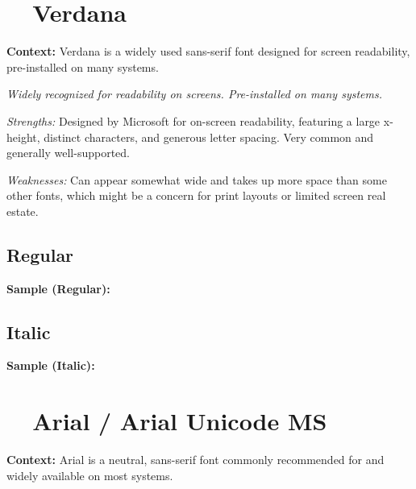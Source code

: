 \pagebreak
\section{~~Verdana}\label{app5:sec:verdana}
\noindent
\textbf{Context:} Verdana is a widely used sans-serif font designed for screen readability, pre-installed on many systems.

\emph{Widely recognized for readability on screens. Pre-installed on many systems.}
\begin{raggedright}
	\emph{Strengths:} Designed by Microsoft for on-screen readability, featuring a large x-height, distinct characters, and generous letter spacing. Very common and generally well-supported.

	\emph{Weaknesses:} Can appear somewhat wide and takes up more space than some other fonts, which might be a concern for print layouts or limited screen real estate.

	\subsection{Regular}
	\noindent\textbf{Sample (Regular):}
	\FontSample{\verdanafont}

	\subsection{Italic}
	\noindent\textbf{Sample (Italic):}
	\FontSample{{\verdanafont\itshape}}
\end{raggedright}




\pagebreak
\section{~~Arial / Arial Unicode MS}\label{app5:sec:arial}
\noindent
\textbf{Context:} Arial is a neutral, sans-serif font commonly recommended for  and widely available on most systems.

